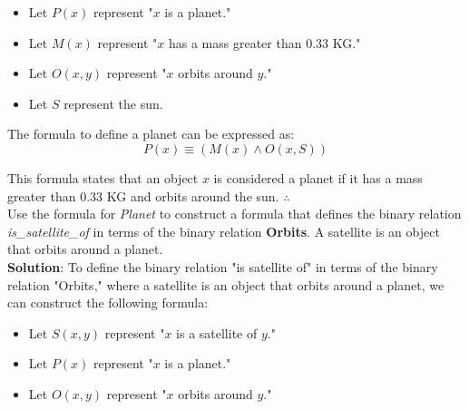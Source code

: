 \documentclass[12pt]{article}
\begin{document}
\begin{spacing}{1.5}
\begin{enumerate}
		      \begin{itemize}
		      			      			      			      			      			      			      			      	
		      	\item Let $P(x)$ represent "$x$ is a planet."
		      	\item Let $M(x)$ represent "$x$ has a mass greater than 0.33 KG."
		      	\item Let $O(x,y)$ represent "$x$ orbits around $y$."
		      	\item Let $S$ represent the sun.
		      	      		      	      		      	      		      	      		      	      		      	      		      	      		      	                   
		      \end{itemize}
		      		      		      		      		      		      		      		      
		      The formula to define a planet can be expressed as:
		      $$P(x)\equiv (M(x) \land O(x, S))$$
		      		      		      		      		      		      		      		      
		      This formula states that an object $x$ is considered a planet if it has a mass greater than 0.33 KG and orbits around the sun. $\therefore$ \\
		      		      		      		      		      		      		      		      		      
		      Use the formula for \textit{Planet} to construct a formula that defines the binary relation
		      \textit{is\_satellite\_of} in terms of the binary relation \textbf{Orbits}. A satellite is an object that orbits around a planet.\\
		      		      		      		      		      		      		      		      
		      \textbf{Solution}: To define the binary relation "is satellite of" in terms of the binary relation "Orbits," where a satellite is an object that orbits around a planet, we can construct the following formula:
		      		      		      		      		      		      		      		      
		      \begin{itemize}
		      			      			      			      			      			      			      			      	
		      	\item Let $S(x,y)$ represent "$x$ is a satellite of $y$."
		      	\item Let $P(x)$ represent "$x$ is a planet."
		      	\item Let $O(x,y)$ represent "$x$ orbits around $y$."
		      	      		      	      		      	      		      	      		      	      		      	      		      	      		      	      

\end{itemize}
\end{enumerate}
\end{spacing}
\end{document}
